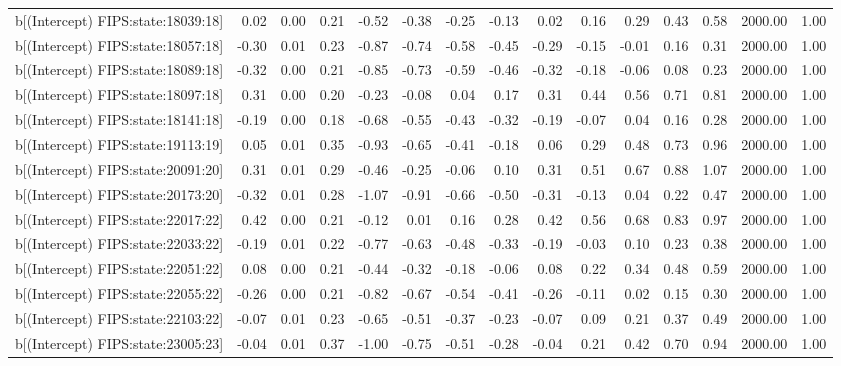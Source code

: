 \begin{table}[ht]
\begin{tabular}{rrrrrrrrrrrrrrr}
  b[(Intercept) FIPS:state:18039:18] & 0.02 & 0.00 & 0.21 & -0.52 & -0.38 & -0.25 & -0.13 & 0.02 & 0.16 & 0.29 & 0.43 & 0.58 & 2000.00 & 1.00 \\ 
  b[(Intercept) FIPS:state:18057:18] & -0.30 & 0.01 & 0.23 & -0.87 & -0.74 & -0.58 & -0.45 & -0.29 & -0.15 & -0.01 & 0.16 & 0.31 & 2000.00 & 1.00 \\ 
  b[(Intercept) FIPS:state:18089:18] & -0.32 & 0.00 & 0.21 & -0.85 & -0.73 & -0.59 & -0.46 & -0.32 & -0.18 & -0.06 & 0.08 & 0.23 & 2000.00 & 1.00 \\ 
  b[(Intercept) FIPS:state:18097:18] & 0.31 & 0.00 & 0.20 & -0.23 & -0.08 & 0.04 & 0.17 & 0.31 & 0.44 & 0.56 & 0.71 & 0.81 & 2000.00 & 1.00 \\ 
  b[(Intercept) FIPS:state:18141:18] & -0.19 & 0.00 & 0.18 & -0.68 & -0.55 & -0.43 & -0.32 & -0.19 & -0.07 & 0.04 & 0.16 & 0.28 & 2000.00 & 1.00 \\ 
  b[(Intercept) FIPS:state:19113:19] & 0.05 & 0.01 & 0.35 & -0.93 & -0.65 & -0.41 & -0.18 & 0.06 & 0.29 & 0.48 & 0.73 & 0.96 & 2000.00 & 1.00 \\ 
  b[(Intercept) FIPS:state:20091:20] & 0.31 & 0.01 & 0.29 & -0.46 & -0.25 & -0.06 & 0.10 & 0.31 & 0.51 & 0.67 & 0.88 & 1.07 & 2000.00 & 1.00 \\ 
  b[(Intercept) FIPS:state:20173:20] & -0.32 & 0.01 & 0.28 & -1.07 & -0.91 & -0.66 & -0.50 & -0.31 & -0.13 & 0.04 & 0.22 & 0.47 & 2000.00 & 1.00 \\ 
  b[(Intercept) FIPS:state:22017:22] & 0.42 & 0.00 & 0.21 & -0.12 & 0.01 & 0.16 & 0.28 & 0.42 & 0.56 & 0.68 & 0.83 & 0.97 & 2000.00 & 1.00 \\ 
  b[(Intercept) FIPS:state:22033:22] & -0.19 & 0.01 & 0.22 & -0.77 & -0.63 & -0.48 & -0.33 & -0.19 & -0.03 & 0.10 & 0.23 & 0.38 & 2000.00 & 1.00 \\ 
  b[(Intercept) FIPS:state:22051:22] & 0.08 & 0.00 & 0.21 & -0.44 & -0.32 & -0.18 & -0.06 & 0.08 & 0.22 & 0.34 & 0.48 & 0.59 & 2000.00 & 1.00 \\ 
  b[(Intercept) FIPS:state:22055:22] & -0.26 & 0.00 & 0.21 & -0.82 & -0.67 & -0.54 & -0.41 & -0.26 & -0.11 & 0.02 & 0.15 & 0.30 & 2000.00 & 1.00 \\ 
  b[(Intercept) FIPS:state:22103:22] & -0.07 & 0.01 & 0.23 & -0.65 & -0.51 & -0.37 & -0.23 & -0.07 & 0.09 & 0.21 & 0.37 & 0.49 & 2000.00 & 1.00 \\ 
  b[(Intercept) FIPS:state:23005:23] & -0.04 & 0.01 & 0.37 & -1.00 & -0.75 & -0.51 & -0.28 & -0.04 & 0.21 & 0.42 & 0.70 & 0.94 & 2000.00 & 1.00 \\ 

\end{tabular}
\end{table}
